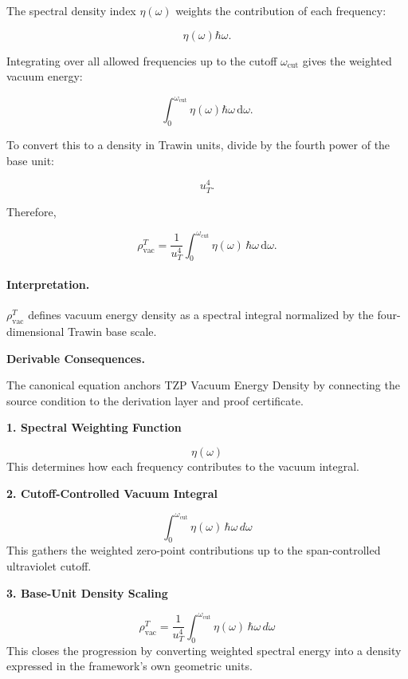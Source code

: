 The spectral density index $\eta(\omega)$ weights the contribution of each frequency:

\begin{equation}
\eta(\omega)\hbar\omega .
\end{equation}

Integrating over all allowed frequencies up to the cutoff $\omega_{\mathrm{cut}}$ gives the weighted vacuum energy:

\begin{equation}
\int_{0}^{\omega_{\mathrm{cut}}}
\eta(\omega)\hbar\omega\,\mathrm{d}\omega .
\end{equation}

To convert this to a density in Trawin units, divide by the fourth power of the base unit:

\begin{equation}
u_T^4 .
\end{equation}

Therefore,

\begin{equation}
\boxed{
\rho_{\mathrm{vac}}^{T}
=
\frac{1}{u_T^4}
\int_{0}^{\omega_{\mathrm{cut}}}
\eta(\omega)\,
\hbar\omega\,
\mathrm{d}\omega .
}
\end{equation}

\paragraph{Interpretation.}
$\rho_{\mathrm{vac}}^{T}$ defines vacuum energy density as a spectral integral normalized by the four-dimensional Trawin base scale.

\par\vspace{0.35em}
\noindent\textbf{Derivable Consequences.}\quad
\begingroup
\footnotesize
\raggedright
The canonical equation anchors TZP Vacuum Energy Density by connecting the source condition to the derivation layer and proof certificate.
\par\endgroup

\noindent\textbf{1. Spectral Weighting Function}\par
\[
\eta(\omega)
\]
\noindent This determines how each frequency contributes to the vacuum integral.\par
\noindent\textbf{2. Cutoff-Controlled Vacuum Integral}\par
\[
\int_{0}^{\omega_{\mathrm{cut}}}
\eta(\omega)\,\hbar\omega\,d\omega
\]
\noindent This gathers the weighted zero-point contributions up to the span-controlled ultraviolet cutoff.\par
\noindent\textbf{3. Base-Unit Density Scaling}\par
\[
\rho_{\mathrm{vac}}^{T}
=
\frac{1}{u_{T}^{4}}
\int_{0}^{\omega_{\mathrm{cut}}}
\eta(\omega)\,\hbar\omega\,d\omega
\]
\noindent This closes the progression by converting weighted spectral energy into a density expressed in the framework's own geometric units.\par

